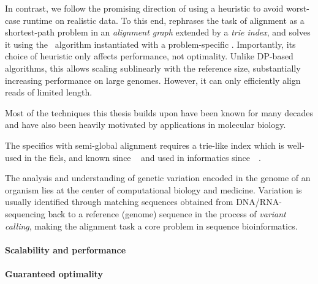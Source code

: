 In contrast, we follow the promising direction of using a heuristic to avoid
worst-case runtime on realistic data. To this end, \astarix rephrases the task
of alignment as a shortest-path problem in an \emph{alignment graph} extended by
a \emph{trie index}, and solves it using the \A~algorithm instantiated with a
problem-specific \prefixh. Importantly, its choice of heuristic only affects
performance, not optimality.
%
Unlike DP-based algorithms, this \prefixh allows scaling sublinearly with the
reference size, substantially increasing performance on large genomes. However,
it can only efficiently align reads of limited length.

Most of the techniques this thesis builds upon have been known for many decades
and have also been heavily motivated by applications in molecular biology. 

The specifics with semi-global alignment requires a trie-like index which is
well-used in the fiels, and known since
\citeyear{thue1912gegenseitige}~\cite{thue1912gegenseitige} and used in
informatics since~\citeyear{de1959file}~\cite{de1959file}.

The analysis and understanding of genetic variation encoded in the genome of an
organism lies at the center of computational biology and medicine. Variation is
usually identified through matching sequences obtained from DNA/RNA-sequencing
back to a reference (genome) sequence in the process of \emph{variant calling},
making the alignment task a core problem in sequence bioinformatics.

\paragraph{Scalability and performance}

\paragraph{Guaranteed optimality}
